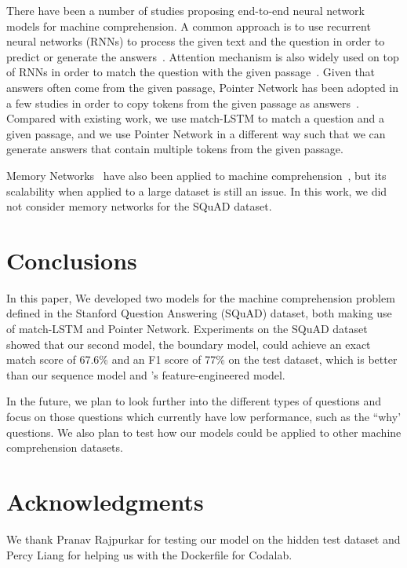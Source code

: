\documentclass{article} \usepackage{iclr2017_conference,times}
\begin{document}
There have been a number of studies proposing end-to-end neural network models for machine comprehension.
A common approach is to use recurrent neural networks (RNNs) to process the given text and the question in order to predict or generate the answers~\citep{hermann2015teaching:nips2015}.
Attention mechanism is also widely used on top of RNNs in order to match the question with the given passage~\citep{hermann2015teaching:nips2015,chen2016thorough:ACL2016}.
Given that answers often come from the given passage, Pointer Network has been adopted in a few studies in order to copy tokens from the given passage as answers~\citep{kadlec2016text:ACL2016,trischler2016natural:emnlp2016}.
Compared with existing work, we use match-LSTM to match a question and a given passage, and we use Pointer Network in a different way such that we can generate answers that contain multiple tokens from the given passage.





Memory Networks~\citep{weston2014memory:ICLR2015} have also been applied to machine comprehension~\citep{sukhbaatar2015end:NIPS2015,kumar2015ask:ICML2016,hill2015goldilocks:ICLR2016},  but its scalability when applied to a large dataset is still an issue.
In this work, we did not consider memory networks for the SQuAD dataset.



%
 \section{Conclusions}
In this paper,
We developed two models for the machine comprehension problem defined in the Stanford Question Answering (SQuAD) dataset, both making use of match-LSTM and Pointer Network.
Experiments on the SQuAD dataset showed that 
our second model, the boundary model, could achieve an exact match score of 67.6\% and an F1 score of 77\% on the test dataset, which is better than our sequence model and
\citet{rajpurkar2016squad}'s feature-engineered model.



In the future, we plan to look further into the different types of questions and focus on those questions which currently have low performance, such as the ``why' questions.
We also plan to test how our models could be applied to other machine comprehension datasets.

 \section{Acknowledgments}
We thank Pranav Rajpurkar for testing our model on the hidden test dataset and Percy Liang for helping us with the Dockerfile for Codalab. 
\end{document}

